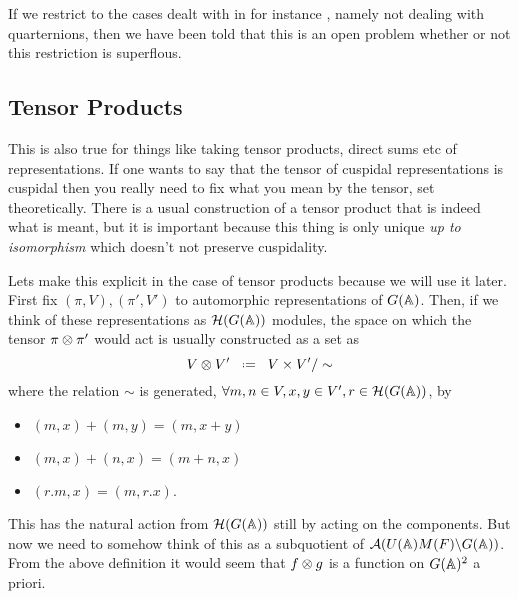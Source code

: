 If we restrict to the cases dealt with in for instance \cite{moeglinSpectralDecompositionEisenstein1995}, namely not dealing with quarternions, then we have been told that this is an open problem whether or not this restriction is superflous. 

\subsection{Tensor Products}
This is also true for things like taking tensor products, direct sums etc of representations. If one wants to say that the tensor of cuspidal representations is cuspidal then you really need to fix what you mean by the tensor, set theoretically. There is a usual construction of a tensor product that is indeed what is meant, but it is important because this thing is only unique \textit{up to isomorphism} which doesn't not preserve cuspidality.

Lets make this explicit in the case of tensor products because we will use it later. First fix \((\pi, V), (\pi', V')\) to automorphic representations of \(G(\A)\). Then, if we think of these representations as \(\mathcal{H}(G(\A))\) modules, the space on which the tensor \(\pi\otimes \pi'\) would act is usually constructed as a set as 
\[V\tensor V' \defeq V\times V' / \sim\]
where the relation \(\sim\) is generated, \(\forall m,n\in V, x,y\in V', r\in \mathcal{H}(G(\A)) \), by
\begin{itemize}
    \item \((m,x) + (m,y) = (m,x+y)\)
    \item \((m,x) + (n,x) = (m+n,x)\)
    \item \((r.m, x) = (m,r.x)\).
\end{itemize}
This has the natural action from \(\mathcal{H}(G(\A))\) still by acting on the components. But now we need to somehow think of this as a subquotient of \(\mathcal{A}(U(\A)M(F) \backslash G(\A))\). From the above definition it would seem that \(f\otimes g\) is a function on \(G(\A)^2\) a priori. 
